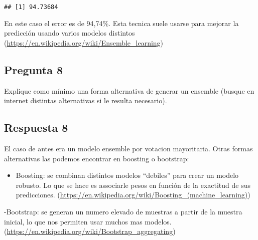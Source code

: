 \documentclass[]{article}
\newenvironment{Shaded}{\begin{snugshade}}{\end{snugshade}}
\newcommand{\KeywordTok}[1]{\textcolor[rgb]{0.94,0.87,0.69}{#1}}
\newcommand{\DecValTok}[1]{\textcolor[rgb]{0.86,0.86,0.80}{#1}}
\newcommand{\StringTok}[1]{\textcolor[rgb]{0.80,0.58,0.58}{#1}}
\newcommand{\OperatorTok}[1]{\textcolor[rgb]{0.94,0.94,0.82}{#1}}
\newcommand{\NormalTok}[1]{\textcolor[rgb]{0.80,0.80,0.80}{#1}}
\providecommand{\tightlist}{%
  \setlength{\itemsep}{0pt}\setlength{\parskip}{0pt}}
\begin{document}
\begin{Shaded}
\end{Shaded}

\begin{verbatim}
## [1] 94.73684
\end{verbatim}

En este caso el error es de 94,74\%. Esta tecnica suele usarse para
mejorar la predicción usando varios modelos distintos
(\url{https://en.wikipedia.org/wiki/Ensemble_learning})

\subsection{Pregunta 8}\label{pregunta-8}

Explique como mínimo una forma alternativa de generar un ensemble
(busque en internet distintas alternativas si le resulta necesario).

\subsection{Respuesta 8}\label{respuesta-8}

El caso de antes era un modelo ensemble por votacion mayoritaria. Otras
formas alternativas las podemos encontrar en boosting o bootstrap:

\begin{itemize}
\tightlist
\item
  Boosting: se combinan distintos modelos ``debiles'' para crear un
  modelo robusto. Lo que se hace es associarle pesos en función de la
  exactitud de sus predicciones.
  (\url{https://en.wikipedia.org/wiki/Boosting_(machine_learning)})
\end{itemize}

-Bootstrap: se generan un numero elevado de muestras a partir de la
muestra inicial, lo que nos permiten usar muchos mas modelos.
(\url{https://en.wikipedia.org/wiki/Bootstrap_aggregating})
\end{document}
